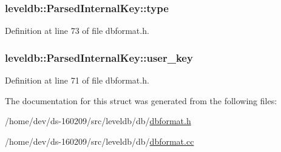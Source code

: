 \subsubsection[{type}]{ leveldb\+::\+Parsed\+Internal\+Key\+::type}\label{structleveldb_1_1_parsed_internal_key_ac7c10a6f60f93982b886ad1fbbafd6c2}


Definition at line 73 of file dbformat.\+h.

\hypertarget{structleveldb_1_1_parsed_internal_key_aa6e30fcf3c95fc1485d60fa08efe2b9d}{}
\subsubsection[{user\+\_\+key}]{ leveldb\+::\+Parsed\+Internal\+Key\+::user\+\_\+key}\label{structleveldb_1_1_parsed_internal_key_aa6e30fcf3c95fc1485d60fa08efe2b9d}


Definition at line 71 of file dbformat.\+h.



The documentation for this struct was generated from the following files\+:\begin{DoxyCompactItemize}
\item 
/home/dev/ds-\/160209/src/leveldb/db/\hyperlink{dbformat_8h}{dbformat.\+h}\item 
/home/dev/ds-\/160209/src/leveldb/db/\hyperlink{dbformat_8cc}{dbformat.\+cc}\end{DoxyCompactItemize}

